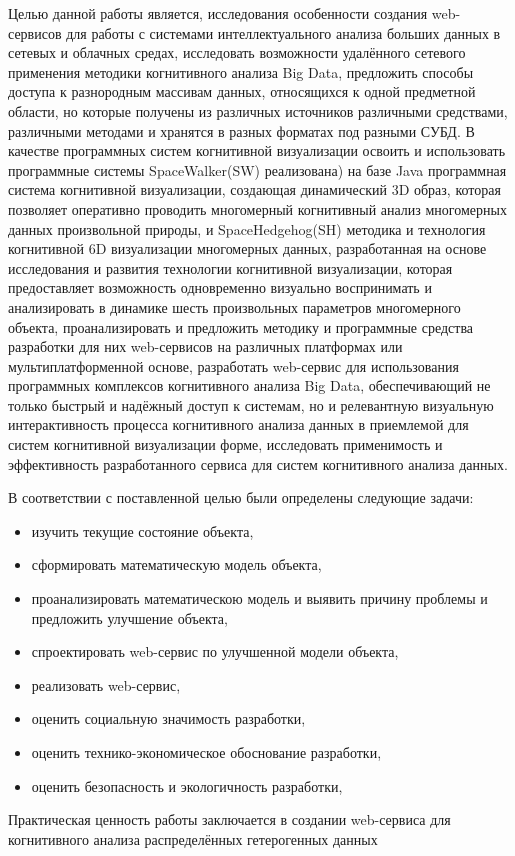 Целью данной работы является, исследования особенности создания web-сервисов для работы с системами интеллектуального анализа больших данных в сетевых и облачных средах, исследовать возможности удалённого сетевого применения методики когнитивного анализа Big Data, предложить способы доступа к разнородным массивам данных, относящихся к одной предметной области, но которые получены из различных источников различными средствами, различными методами и хранятся в разных форматах под разными СУБД. В качестве программных систем когнитивной визуализации освоить и использовать программные системы SpaceWalker(SW) реализована\right)  на базе Java программная система когнитивной визуализации, создающая динамический 3D образ, которая позволяет оперативно проводить многомерный когнитивный анализ многомерных данных произвольной природы, и SpaceHedgehog(SH) методика и технология когнитивной 6D визуализации многомерных данных, разработанная на основе исследования и развития технологии когнитивной визуализации, которая предоставляет возможность одновременно визуально воспринимать и анализировать в динамике шесть произвольных параметров многомерного объекта, проанализировать и предложить методику и программные средства разработки для них web-сервисов на различных платформах или мультиплатформенной основе, разработать web-сервис для использования программных комплексов когнитивного анализа Big Data, обеспечивающий не только быстрый и надёжный доступ к системам, но и релевантную визуальную интерактивность процесса когнитивного анализа данных в приемлемой для систем когнитивной визуализации форме, исследовать применимость и эффективность разработанного сервиса для систем когнитивного анализа данных.

В соответствии с поставленной целью были определены следующие задачи:
\begin{itemize}
    \item изучить текущие состояние объекта,
    \item сформировать математическую модель объекта,
    \item проанализировать математическою модель и выявить причину проблемы и предложить улучшение объекта, 
    \item спроектировать web-сервис по улучшенной модели объекта,
    \item реализовать web-сервис,
    \item оценить социальную значимость разработки,  
    \item оценить технико-экономическое обоснование разработки,
    \item оценить безопасность и экологичность разработки,
\end{itemize}

 Практическая ценность работы заключается в создании web-сервиса для когнитивного анализа распределённых гетерогенных данных

\pagebreak